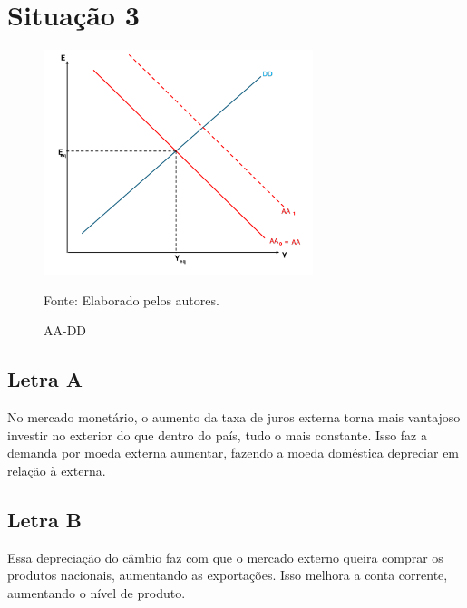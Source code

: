 \documentclass[a4paper,12pt]{article}[abntex2]
\begin{document}
\section{\textbf{Situação 3}}
\begin{figure}[H]
    \centering
    \caption{AA-DD} 
    \includegraphics[width=0.7\textwidth]{4º Período/Macroeconomia Internacional/APS 4 Macro Int/AA-DD L(c).png}
    \label{fig:AADD L}
    
    \footnotesize{Fonte: Elaborado pelos autores.}
    \end{figure}

\subsection{\textbf{Letra A}}

No mercado monetário, o aumento da taxa de juros externa torna mais vantajoso investir no exterior do que dentro do país, tudo o mais constante. Isso faz a demanda por moeda externa aumentar, fazendo a moeda doméstica depreciar em relação à externa.

\subsection{\textbf{Letra B}}

Essa depreciação do câmbio faz com que o mercado externo queira comprar os produtos nacionais, aumentando as exportações. Isso melhora a conta corrente, aumentando o nível de produto.
\end{document}
